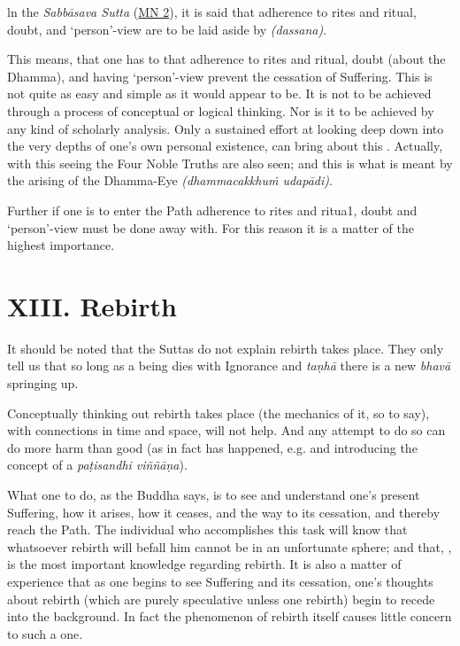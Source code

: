 ln the \emph{Sabbāsava Sutta} (\href{https://suttacentral.net/mn2/en/bodhi}{MN 2}), it is said that adherence to rites and ritual, doubt, and `person'-view are to be laid aside by  \emph{(dassana)}.

This means, that one has to  that adherence to rites and ritual, doubt (about the Dhamma), and having `person'-view prevent the cessation of Suffering. This  is not quite as easy and simple as it would appear to be. It is not to be achieved through a process of conceptual or logical thinking. Nor is it to be achieved by any kind of scholarly analysis. Only a sustained effort at looking deep down into the very depths of one's own personal existence, can bring about this . Actually, with this seeing the Four Noble Truths are also seen; and this is what is meant by the arising of the Dhamma-Eye \emph{(dhammacakkhuṁ udapādi)}.

Further if one is to enter the Path adherence to rites and ritua1, doubt and `person'-view must be done away with. For this reason it is a matter of the highest importance.

\hypertarget{_xiii_rebirth}{%
\section{XIII. Rebirth}\label{_xiii_rebirth}}

It should be noted that the Suttas do not explain  rebirth takes place. They only tell us that so long as a being dies with Ignorance and \emph{taṇhā} there is a new \emph{bhavā} springing up.

Conceptually thinking out  rebirth takes place (the mechanics of it, so to say), with connections in time and space, will not help. And any attempt to do so can do more harm than good (as in fact has happened, e.g.  and introducing the concept of a \emph{paṭisandhi viññāṇa}).

What one  to do, as the Buddha says, is to see and understand one's present Suffering, how it arises, how it ceases, and the way to its cessation, and thereby reach the Path. The individual who accomplishes this task will know that whatsoever rebirth will befall him cannot be in an unfortunate sphere; and that, , is the most important knowledge regarding rebirth. It is also a matter of experience that as one begins to see Suffering and its cessation, one's thoughts about rebirth (which are purely speculative unless one  rebirth) begin to recede into the background. In fact the phenomenon of rebirth itself causes little concern to such a one.

